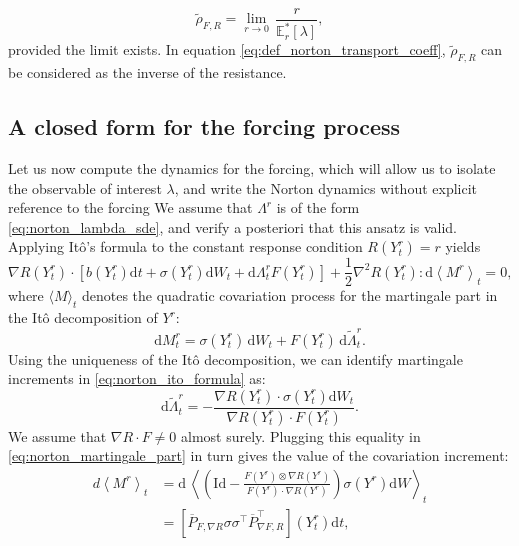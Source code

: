 \documentclass[pdflatex,sn-mathphys]{sn-jnl}%
\theoremstyle{thmstyleone}%
\theoremstyle{thmstyletwo}%
\theoremstyle{thmstylethree}%
\renewcommand{\d}{\mathrm{d}}
\newcommand{\1}{\mathbbm{1}}
\newcommand{\Yr}{Y^r}
\newcommand{\Lambdar}{\Lambda^r}
\begin{document}
\begin{equation}
    \label{eq:def_norton_transport_coeff}
    \widetilde{\rho}_{F,R} = \underset{r\to 0}{\lim}\,\frac{r}{\mathbb{E}_r^* \left[\lambda\right]},
\end{equation}
provided the limit exists. In equation \eqref{eq:def_norton_transport_coeff}, $\widetilde{\rho}_{F,R}$ can be considered as the inverse of the resistance.

\subsection{A closed form for the forcing process}
Let us now compute the dynamics for the forcing, which will allow us to isolate the observable of interest $\lambda$, and write the Norton dynamics without explicit reference to the forcing 
We assume that $\Lambdar$ is of the form \eqref{eq:norton_lambda_sde}, and verify a posteriori that this ansatz is valid.
Applying Itô's formula to the constant response condition $R(\Yr_t)=r$ yields
\begin{equation}
\label{eq:norton_ito_formula}
    \nabla R(\Yr_t)\cdot \left[b(\Yr_t) \d t + \sigma(\Yr_t) \d W_t + \d\Lambdar_t F(\Yr_t)\right] +\frac 12 \nabla ^2 R(\Yr_t) : \d\left\langle M^r\right\rangle_t = 0,
\end{equation}
where $\langle M \rangle_t$ denotes the quadratic covariation process for the martingale part in the Itô decomposition of $\Yr$:
\begin{equation}
    \label{eq:norton_martingale_part}
    \d M^r_t = \sigma(\Yr_t)\,\d W_t + F(\Yr_t)\,\d \widetilde{\Lambda}^r_t.
\end{equation}
Using the uniqueness of the Itô decomposition, we can identify martingale increments in \eqref{eq:norton_ito_formula} as:
\begin{equation}
    \label{eq:norton_forcing_martingale_part}
    \d \widetilde{\Lambda}^r_t = -\frac{\nabla R(\Yr_t) \cdot \sigma(\Yr_t) \d W_t}{\nabla R(\Yr_t)\cdot F(\Yr_t)}.
\end{equation}
We assume that $\nabla R \cdot F \neq 0$ almost surely.
Plugging this equality in \eqref{eq:norton_martingale_part} in turn gives the value of the covariation increment:
\begin{equation}
    \label{eq:norton_covariation_increment}
    \begin{aligned}
    d\left\langle M^r\right\rangle_t &=\d\,\left\langle \left(\mathrm{Id} -\frac{F(\Yr) \otimes \nabla R(\Yr)}{F(\Yr) \cdot \nabla R(\Yr)}\right)\sigma(\Yr) \d W\right\rangle_t\\
    &= \left[\overline{P}_{F,\nabla R} \sigma\sigma ^\intercal \overline{P}_{\nabla F,R}^\intercal\right](\Yr_t)\d t,
    \end{aligned}
\end{equation}
\end{document}
